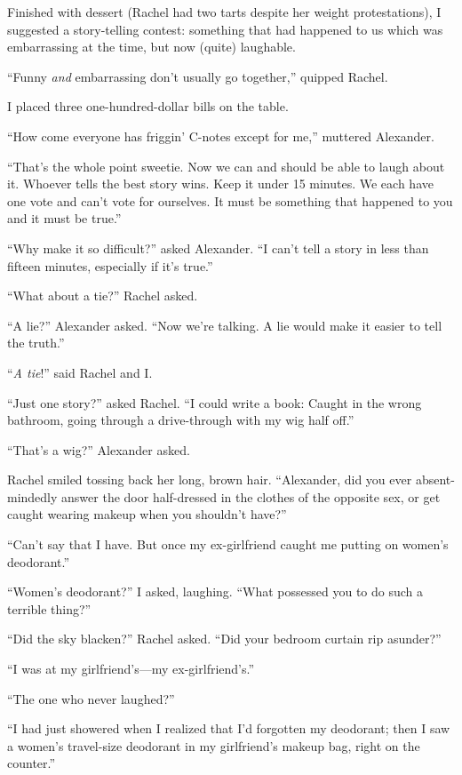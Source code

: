 Finished with dessert (Rachel had two tarts despite her weight
protestations), I suggested a story-telling contest: something that had
happened to us which was embarrassing at the time, but now (quite)
laughable.

``Funny \emph{and} embarrassing don't usually go together,'' quipped
Rachel.

I placed three one-hundred-dollar bills on the table.

``How come everyone has friggin' C-notes except for me,'' muttered
Alexander.

``That's the whole point sweetie. Now we can and should be able to laugh
about it. Whoever tells the best story wins. Keep it under 15 minutes.
We each have one vote and can't vote for ourselves. It must be something
that happened to you and it must be true.''

``Why make it so difficult?'' asked Alexander. ``I can't tell a story in
less than fifteen minutes, especially if it's true.''

``What about a tie?'' Rachel asked.

``A lie?'' Alexander asked. ``Now we're talking. A lie would make it
easier to tell the truth.''

``\emph{A tie}!'' said Rachel and I.

``Just one story?'' asked Rachel. ``I could write a book: Caught in the
wrong bathroom, going through a drive-through with my wig half off.''

``That's a wig?'' Alexander asked.

Rachel smiled tossing back her long, brown hair. ``Alexander, did you
ever absent-mindedly answer the door half-dressed in the clothes of the
opposite sex, or get caught wearing makeup when you shouldn't have?''

``Can't say that I have. But once my ex-girlfriend caught me putting on
women's deodorant.''

``Women's deodorant?'' I asked, laughing. ``What possessed you to do
such a terrible thing?''

``Did the sky blacken?'' Rachel asked. ``Did your bedroom curtain rip
asunder?''

``I was at my girlfriend's---my ex-girlfriend's.''

``The one who never laughed?''

``I had just showered when I realized that I'd forgotten my deodorant;
then I saw a women's travel-size deodorant in my girlfriend's makeup
bag, right on the counter.''

